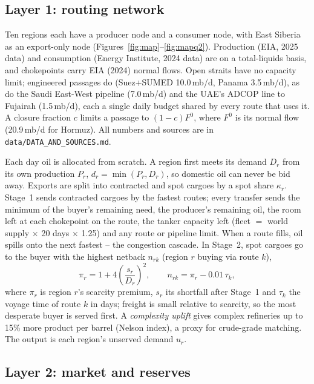 \documentclass[11pt,a4paper]{article}
\begin{document}
\subsection{Layer 1: routing network}

Ten regions each have a producer node and a consumer node, with East Siberia as an export-only node (Figures~\ref{fig:map}--\ref{fig:mapq2}). Production (EIA, 2025 data) and consumption (Energy Institute, 2024 data) are on a total-liquids basis, and chokepoints carry EIA (2024) normal flows. Open straits have no capacity limit; engineered passages do (Suez+SUMED 10.0\,mb/d, Panama 3.5\,mb/d), as do the Saudi East-West pipeline (7.0\,mb/d) and the UAE's ADCOP line to Fujairah (1.5\,mb/d), each a single daily budget shared by every route that uses it. A closure fraction $c$ limits a passage to $(1-c)F^{0}$, where $F^{0}$ is its normal flow (20.9\,mb/d for Hormuz). All numbers and sources are in \texttt{data/DATA\_AND\_SOURCES.md}.

Each day oil is allocated from scratch. A region first meets its demand $D_r$ from its own production $P_r$, $d_r=\min(P_r,D_r)$, so domestic oil can never be bid away. Exports are split into contracted and spot cargoes by a spot share $\kappa_r$. Stage~1 sends contracted cargoes by the fastest routes; every transfer sends the minimum of the buyer's remaining need, the producer's remaining oil, the room left at each chokepoint on the route, the tanker capacity left (fleet $=$ world supply $\times$ 20 days $\times$ 1.25) and any route or pipeline limit. When a route fills, oil spills onto the next fastest -- the congestion cascade. In Stage~2, spot cargoes go to the buyer with the highest netback $n_{rk}$ (region $r$ buying via route $k$),
\begin{equation}\label{eq:bid}
\pi_r = 1 + 4\left(\frac{s_r}{D_r}\right)^{2}, \qquad n_{rk} = \pi_r - 0.01\,\tau_k ,
\end{equation}
where $\pi_r$ is region $r$'s scarcity premium, $s_r$ its shortfall after Stage~1 and $\tau_k$ the voyage time of route $k$ in days; freight is small relative to scarcity, so the most desperate buyer is served first. A \emph{complexity uplift} gives complex refineries up to 15\% more product per barrel (Nelson index), a proxy for crude-grade matching. The output is each region's unserved demand $u_r$.

\subsection{Layer 2: market and reserves}
\end{document}
